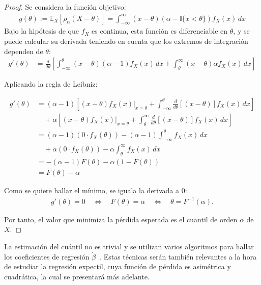 \documentclass[11pt]{book}
\theoremstyle{plain} %
\theoremstyle{definition} %
\begin{document}
\begin{proof}
Se considera la función objetivo:
\begin{align*}
   g(\theta) := \mathbb{E}_X[\rho_\alpha(X - \theta)] = \int_{-\infty}^{\infty} (x - \theta)(\alpha - \mathbb{I}\{x < \theta\}) f_X(x) \, dx
\end{align*}
Bajo la hipótesis de que $f_X$ es continua, esta función es diferenciable en 
$\theta$, y se puede calcular su derivada teniendo en cuenta que los extremos 
de integración dependen de $\theta$:
\begin{align*}
   g'(\theta) &= \frac{d}{d\theta} \left[ \int_{-\infty}^{\theta} (x - \theta)(\alpha - 1) f_X(x) \, dx + \int_{\theta}^{\infty} (x - \theta)\alpha f_X(x) \, dx \right]
\end{align*}

Aplicando la regla de Leibniz:

\begin{align*}
   g'(\theta) &= (\alpha - 1) \left[ (x - \theta) f_X(x) \big|_{x = \theta} + \int_{-\infty}^{\theta} \frac{d}{d \theta}[(x - \theta)] f_X(x) \, dx \right] \\
   &\quad + \alpha \left[ (x - \theta) f_X(x) \big|_{x = \theta} + \int_{\theta}^{\infty} \frac{d}{d \theta}[(x - \theta)] f_X(x) \, dx \right] \\
   &= (\alpha - 1)(0 \cdot f_X(\theta)) - (\alpha - 1)\int_{-\infty}^{\theta} f_X(x) \, dx \\
   &\quad + \alpha (0 \cdot f_X(\theta)) - \alpha \int_{\theta}^{\infty} f_X(x) \, dx \\
   &= -(\alpha - 1) F(\theta) - \alpha (1 - F(\theta)) \\
   &= F(\theta) - \alpha
\end{align*}

Como se quiere hallar el mínimo, se iguala la derivada a 0:
\begin{align*}
   g'(\theta) = 0 \quad \Longleftrightarrow \quad F(\theta) = \alpha \quad \Longleftrightarrow \quad \theta = F^{-1}(\alpha).
\end{align*}

Por tanto, el valor que minimiza la pérdida esperada es el cuantil de orden 
$\alpha$ de $X$.
\end{proof}

La estimación del cuántil no es trivial y se utilizan varios algoritmos para 
hallar los coeficientes de regresión $\dot{\beta}$~\cite[p.~11]{MC20}. Estas 
técnicas serán también relevantes a la hora de estudiar la regresión expectil, 
cuya función de pérdida es asimétrica y cuadrática, la cual se presentará 
más adelante. \\
\end{document}

